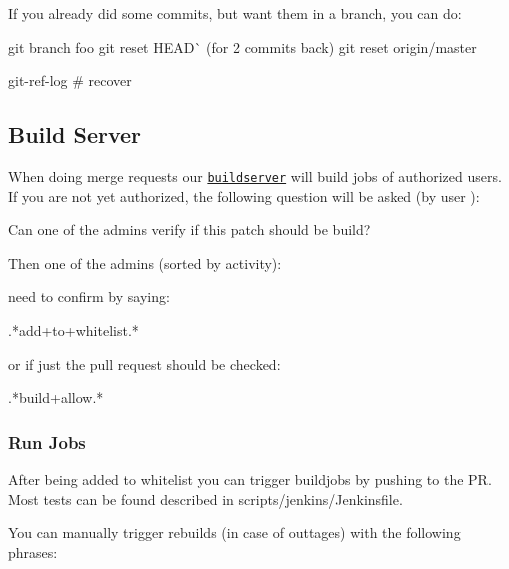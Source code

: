 If you already did some commits, but want them in a branch, you can do\+: \begin{DoxyVerb}    git branch foo
    git reset HEAD^^  (for 2 commits back)
    git reset origin/master

    git-ref-log # recover
\end{DoxyVerb}


\subsection*{Build Server}

When doing merge requests our \href{https://build.libelektra.org}{\tt buildserver} will build jobs of authorized users. If you are not yet authorized, the following question will be asked (by user )\+: \begin{DoxyVerb}    Can one of the admins verify if this patch should be build?
\end{DoxyVerb}


Then one of the admins (sorted by activity)\+:


\begin{DoxyItemize}
\item 
\item 
\item 
\item 
\item 
\item 
\end{DoxyItemize}

need to confirm by saying\+: \begin{DoxyVerb}    .*add\W+to\W+whitelist.*
\end{DoxyVerb}


or if just the pull request should be checked\+: \begin{DoxyVerb}    .*build\W+allow.*
\end{DoxyVerb}


\subsubsection*{Run Jobs}

After being added to whitelist you can trigger buildjobs by pushing to the PR. Most tests can be found described in scripts/jenkins/\+Jenkinsfile.

You can manually trigger rebuilds (in case of outtages) with the following phrases\+:


